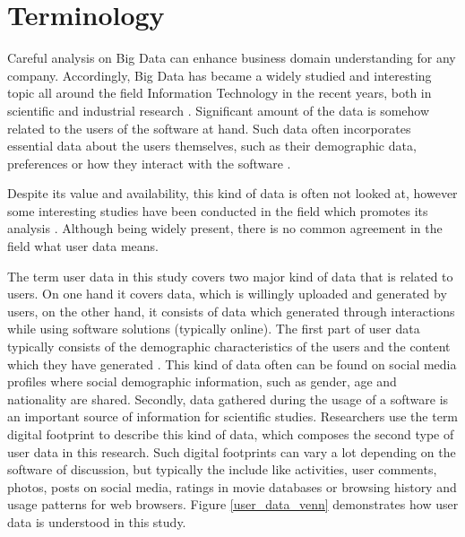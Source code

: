 \documentclass[conference]{IEEEtran}
\begin{document}
\section{Terminology}
Careful analysis on Big Data can enhance business domain understanding for any company. Accordingly, Big Data has became a widely studied and interesting topic all around the field Information Technology in the recent years, both in scientific and industrial research \cite{inmon2007tapping, introtodatamining}. Significant amount of the data is somehow related to the users of the software at hand. Such data often incorporates essential data about the users themselves, such as their demographic data, preferences or how they interact with the software 
\cite{jang2015noreciprocity, hu2014we, jang2016teensengagemorewithfewerphotos, han2016teensarefrommars, socialdiversityongithub}. 

Despite its value and availability, this kind of data is often not looked at, however some interesting studies have been conducted in the field which promotes its analysis \cite{jang2016teensengagemorewithfewerphotos}. Although being widely present, there is no common agreement in the field what user data means.

The term user data in this study covers two major kind of data that is related to users. On one hand it covers data, which is willingly uploaded and generated by users, on the other hand, it consists of data which generated through interactions while using software solutions (typically online).
The first part of user data typically consists of the demographic characteristics of the users and the content which they have generated \cite{han2016teensarefrommars}. This kind of data often can be found on social media profiles where social demographic information, such as gender, age and nationality are shared.
Secondly, data gathered during the usage of a software is an important source of information for scientific studies. Researchers use the term digital footprint \cite{youyou2015computer} to describe this kind of data, which composes the second type of user data in this research. Such digital footprints can vary a lot depending on the software of discussion, but typically the include like activities, user comments, photos, posts on social media, ratings in movie databases or browsing history and usage patterns for web browsers. Figure \ref{user_data_venn} demonstrates how user data is understood in this study.
\end{document}
